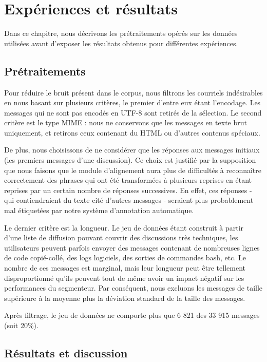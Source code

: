 
\chapter{Expériences et résultats}

\label{ch:experiments_and_results}

Dans ce chapitre, nous décrivons les prétraitements opérés sur les données utilisées avant d'exposer les résultats obtenus pour différentes expériences.

\section{Prétraitements}

Pour réduire le bruit présent dans le corpus, nous filtrons les courriels indésirables en nous basant sur plusieurs critères, le premier d'entre eux étant l'encodage. Les messages qui ne sont pas encodés en UTF-8 sont retirés de la sélection. Le second critère est le type MIME : nous ne conservons que les messages en texte brut uniquement, et retirons ceux contenant du HTML ou d'autres contenus spéciaux.

De plus, nous choisissons de ne considérer que les réponses aux messages initiaux (les premiers messages d'une discussion). Ce choix est justifié par la supposition que nous faisons que le module d'alignement aura plus de difficultés à reconnaître correctement des phrases qui ont été transformées à plusieurs reprises en étant reprises par un certain nombre de réponses successives. En effet, ces réponses - qui contiendraient du texte cité d'autres messages - seraient plus probablement mal étiquetées par notre système d'annotation automatique.

Le dernier critère est la longueur. Le jeu de données étant construit à partir d'une liste de diffusion pouvant couvrir des discussions très techniques, les utilisateurs peuvent parfois envoyer des messages contenant de nombreuses lignes de code copié-collé, des logs logiciels, des sorties de commandes bash, etc. Le nombre de ces messages est marginal, mais leur longueur peut être tellement disproportionné qu'ils peuvent tout de même avoir un impact négatif sur les performances du segmenteur. Par conséquent, nous excluons les messages de taille supérieure à la moyenne plus la déviation standard de la taille des messages.

Après filtrage, le jeu de données ne comporte plus que 6 821 des 33 915 messages (soit 20\%).

\section{Résultats et discussion}

